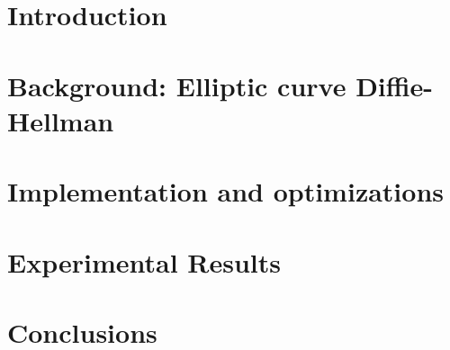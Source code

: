 


%
\maketitle
%

\begin{abstract}

\end{abstract}

\section{Introduction}\label{sec:intro}


\section{Background: Elliptic curve Diffie-Hellman}\label{sec:background}


\section{Implementation and optimizations}\label{sec:yourmethod}


\section{Experimental Results}\label{sec:exp}


\section{Conclusions}







